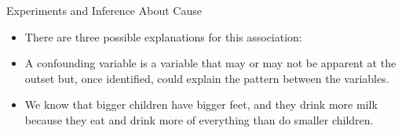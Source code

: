 \documentclass[handout]{beamer}
\begin{document}
\begin{frame}{Experiments and Inference About Cause}
\scriptsize{

\begin{itemize}
\item There are three possible explanations for this association:


 \item A confounding variable is a variable that may or may not be apparent at the outset but, once identified, could explain the pattern between the variables.

\item We know that bigger children have bigger feet, and they drink more milk because they eat and drink more of everything than do smaller children.


\end{itemize}



} 
\end{frame}
\end{document}
